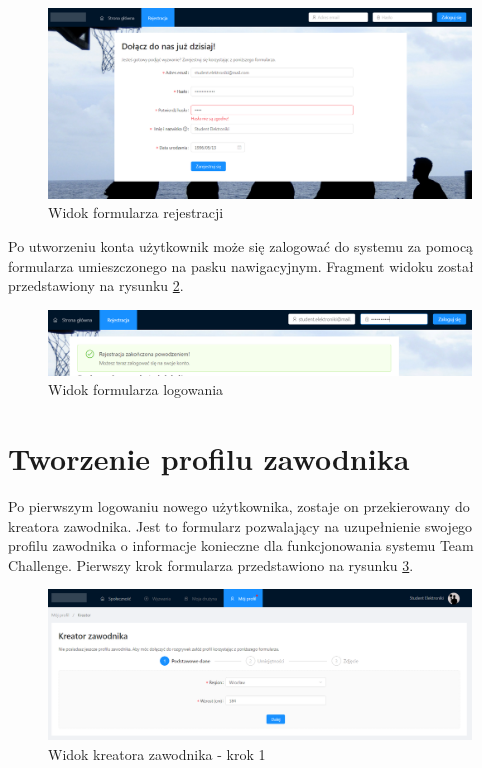 \begin{figure}[H]
\centering
\includegraphics[width=\linewidth]{065-dzialanie/rys/ss-register.PNG}
\caption{Widok formularza rejestracji}
\label{fig:ss-register}
\end{figure}

Po utworzeniu konta użytkownik może się zalogować do systemu za pomocą formularza umieszczonego na pasku nawigacyjnym. Fragment widoku został przedstawiony na rysunku \ref{fig:ss-login}.

\begin{figure}[H]
\centering
\includegraphics[width=\linewidth]{065-dzialanie/rys/ss-login.PNG}
\caption{Widok formularza logowania}
\label{fig:ss-login}
\end{figure}

\section{Tworzenie profilu zawodnika}

Po pierwszym logowaniu nowego użytkownika, zostaje on przekierowany do kreatora zawodnika. Jest to formularz pozwalający na uzupełnienie swojego profilu zawodnika o informacje konieczne dla funkcjonowania systemu Team Challenge. Pierwszy krok formularza przedstawiono na rysunku \ref{fig:ss-profile-1}.


\begin{figure}[H]
\centering
\includegraphics[width=\linewidth]{065-dzialanie/rys/ss-profile-1.PNG}
\caption{Widok kreatora zawodnika - krok 1}
\label{fig:ss-profile-1}
\end{figure}

